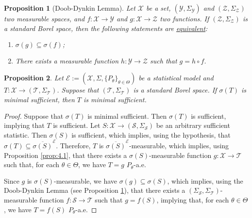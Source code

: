 \documentclass[10pt,a4paper]{amsart}
\newtheorem{proposition}{Proposition}
\begin{document}
\begin{proposition}[Doob-Dynkin Lemma]
\label{doob_lemma}
Let $\mathcal{X}$ be a set, $(\mathcal{Y},\Sigma _\mathcal{Y})$ and $(\mathcal{Z},\Sigma _\mathcal{Z})$ two measurable spaces, and $f:\mathcal{X}\to \mathcal{Y}$ and $g:\mathcal{X}\to \mathcal{Z}$ two functions. If $(\mathcal{Z},\Sigma _\mathcal{Z})$ is a standard Borel space, then the following statements are \underline{equivalent}:
    \begin{enumerate}
        \item $\sigma (g)\subseteq \sigma (f)$;
        \item There exists a measurable function $h:\mathcal{Y}\to \mathcal{Z}$ such that $g=h\circ f$.
    \end{enumerate}
\end{proposition}

\begin{proposition}
\label{prop:4.5}
Let $\mathcal{E}:=(\mathcal{X},\Sigma,\{P_\theta\}_{\theta\in\Theta})$ be a statistical model and $T:\mathcal{X}\to (\mathcal{T},\Sigma _\mathcal{T})$. Suppose that $(\mathcal{T},\Sigma _\mathcal{T})$ is a standard Borel space. If $\sigma (T)$ is minimal sufficient, then $T$ is minimal sufficient.
\end{proposition}

\begin{proof}
Suppose that $\sigma (T)$ is minimal sufficient. Then $\sigma (T)$ is sufficient, implying that $T$ is sufficient. Let $S:\mathcal{X}\to (\mathcal{S},\Sigma _\mathcal{S})$ be an arbitrary sufficient statistic. Then $\sigma (S)$ is sufficient, which implies, using the hypothesis, that $\sigma (T)\subseteq \overline{\sigma (S)}^\mathcal{E}$. Therefore, $T$ is $\overline{\sigma (S)}^\mathcal{E}$-measurable, which implies, using Proposition \ref{prop:4.1}, that there exists a $\sigma (S)$-measurable function $g:\mathcal{X}\to \mathcal{T}$ such that, for each $\theta\in\Theta$, we have $T=g$ $P_\theta$-a.e.

Since $g$ is $\sigma (S)$-measurable, we have $\sigma (g)\subseteq \sigma (S)$, which implies, using the Doob-Dynkin Lemma (see Proposition \ref{doob_lemma}), that there exists a $(\Sigma _\mathcal{S},\Sigma _\mathcal{T})$-measurable function $f:\mathcal{S}\to \mathcal{T}$ such that $g=f(S)$, implying that, for each $\theta\in\Theta$, we have $T=f(S)$ $P_\theta$-a.e.
\end{proof}
\end{document}
